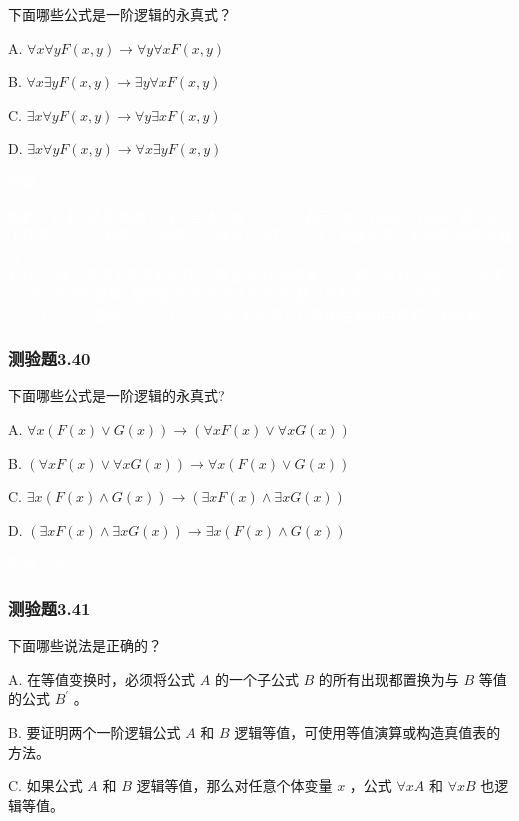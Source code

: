 \documentclass[UTF8, heading=true]{ctexart}
\begin{document}
下面哪些公式是一阶逻辑的永真式？

A. $ \forall x \forall y F(x, y) \rightarrow \forall y \forall x F(x, y)$

B. $\forall x \exists y F(x, y) \rightarrow \exists y \forall x F(x, y)$

C. $\exists x \forall y F(x, y) \rightarrow \forall y \exists x F(x, y)$

D. $ \exists x \forall y F(x, y) \rightarrow \forall x \exists y F(x, y)$

\textcolor{white}{答案：AC}

\textcolor{white}{解析：对于B选项,构造论域为全体人类,$F(x,y)$表示$y$为$x$的母亲。则前件表示对于任意一个人$x$,都有一个母亲；后件表示存在一个人$x$,她是所有人的母亲,显然不成立；
\\ \indent 对比BC两个选项,B选项的前件$y$不是固定的,也即每一个$x$都可以对应到一个不同的$y$。而C选项的前件$x$是固定的,也即对于所有的$y$都对应到同一个$x$。因此$\exists x \forall y F(x, y)$是强于$\forall y \exists x F(x, y)$的,即前者可以推出后者但后者推不出前者。}

\subsubsection{测验题3.40}

下面哪些公式是一阶逻辑的永真式?

A. $
\forall x(F(x) \vee G(x)) \rightarrow(\forall x F(x) \vee \forall x G(x))
$

B. $
(\forall x F(x) \vee \forall x G(x)) \rightarrow \forall x(F(x) \vee G(x))
$

C. $
\exists x(F(x) \wedge G(x)) \rightarrow(\exists x F(x) \wedge \exists x G(x))
$

D. $
(\exists x F(x) \wedge \exists x G(x)) \rightarrow \exists x(F(x) \wedge G(x))
$

\textcolor{white}{答案：BC}

\subsubsection{测验题3.41}

下面哪些说法是正确的？

A.
在等值变换时，必须将公式 $A$ 的一个子公式 $B$ 的所有出现都置换为与 $B$ 等值的公式 $B^{\prime}$ 。

B.
要证明两个一阶逻辑公式 $A$ 和 $B$ 逻辑等值，可使用等值演算或构造真值表的方法。

C.
如果公式 $A$ 和 $B$ 逻辑等值，那么对任意个体变量 $x$ ，公式 $\forall x A$ 和 $\forall x B$ 也逻辑等值。
\end{document}
